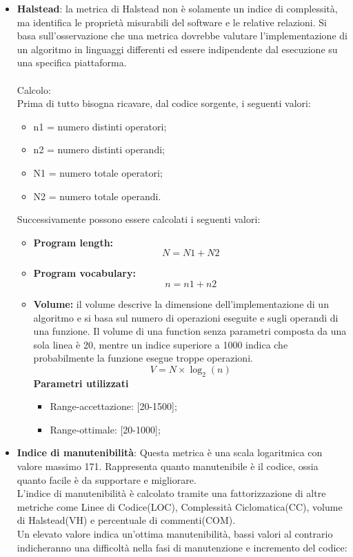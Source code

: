 {{\begin{itemize}
		\item \textbf{Halstead}: la metrica di Halstead non è solamente un indice di complessità, ma identifica le proprietà misurabili del software e le relative relazioni. Si basa sull’osservazione che una metrica dovrebbe	valutare l’implementazione di un algoritmo in linguaggi differenti ed essere indipendente dal esecuzione su una specifica piattaforma.\\\\
		Calcolo:\\
		Prima di tutto bisogna ricavare, dal codice sorgente, i seguenti valori:
		\begin{itemize}		
		\item n1 = numero distinti operatori;
		\item n2 = numero distinti operandi;
		\item N1 = numero totale operatori;
		\item N2 = numero totale operandi.
		
	    \end{itemize}
	    Successivamente possono essere calcolati i seguenti valori:
	    \begin{itemize}
		\item \textbf{Program length:} \[N = N1 + N2\]
		\item \textbf{Program vocabulary:} \[n = n1 + n2\]
	    \item \textbf{Volume:} il volume descrive la dimensione dell’implementazione di un algoritmo e si basa sul numero di operazioni eseguite e sugli operandi di una funzione. Il volume di una function senza parametri composta da una sola linea è 20, mentre un indice superiore a 1000 indica che probabilmente la funzione esegue troppe operazioni. \[V= N \times \log_2(n)\]
	      \textbf{Parametri utilizzati}
	      \begin{itemize}
	       \item Range-accettazione: [20-1500];
	       \item Range-ottimale: [20-1000];
	      \end{itemize}
		\end{itemize}
		\item \textbf{Indice di manutenibilità}: Questa metrica è una scala logaritmica con valore massimo 171. Rappresenta quanto manutenibile è il codice, ossia quanto facile è da supportare e migliorare.\\
		L'indice di manutenibilità è calcolato tramite una fattorizzazione di altre metriche come Linee di Codice(LOC), Complessità Ciclomatica(CC), volume di Halstead(VH) e percentuale di commenti(COM).\\
		Un elevato valore indica un'ottima manutenibilità, bassi valori al contrario indicheranno una difficoltà nella fasi di manutenzione e incremento del codice:
		

\end{itemize}}}
